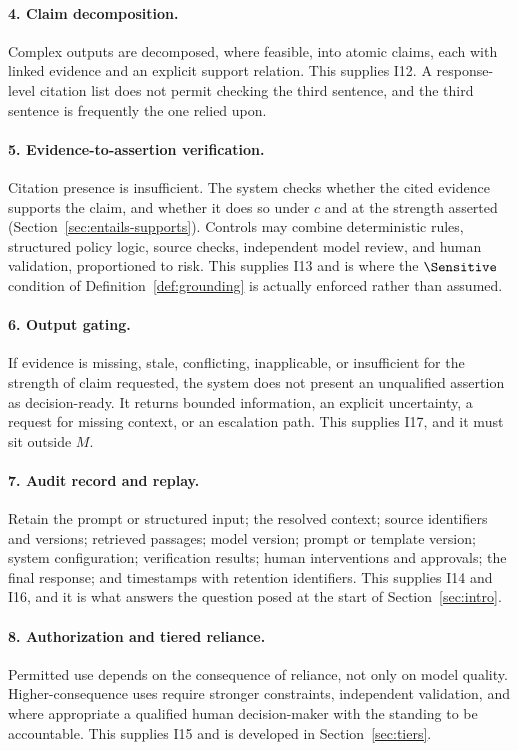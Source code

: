 \paragraph{4. Claim decomposition.} Complex outputs are decomposed, where feasible,
into atomic claims, each with linked evidence and an explicit support relation. This
supplies I12. A response-level citation list does not permit checking the third
sentence, and the third sentence is frequently the one relied upon.

\paragraph{5. Evidence-to-assertion verification.} Citation presence is
insufficient. The system checks whether the cited evidence supports the claim, and
whether it does so under $c$ and at the strength asserted
(Section~\ref{sec:entails-supports}). Controls may combine deterministic rules,
structured policy logic, source checks, independent model review, and human
validation, proportioned to risk. This supplies I13 and is where the
$\Sensitive$ condition of Definition~\ref{def:grounding} is actually enforced
rather than assumed.

\paragraph{6. Output gating.} If evidence is missing, stale, conflicting,
inapplicable, or insufficient for the strength of claim requested, the system does
not present an unqualified assertion as decision-ready. It returns bounded
information, an explicit uncertainty, a request for missing context, or an
escalation path. This supplies I17, and it must sit outside $M$.

\paragraph{7. Audit record and replay.} Retain the prompt or structured input; the
resolved context; source identifiers and versions; retrieved passages; model
version; prompt or template version; system configuration; verification results;
human interventions and approvals; the final response; and timestamps with
retention identifiers. This supplies I14 and I16, and it is what answers the
question posed at the start of Section~\ref{sec:intro}.

\paragraph{8. Authorization and tiered reliance.} Permitted use depends on the
consequence of reliance, not only on model quality. Higher-consequence uses require
stronger constraints, independent validation, and where appropriate a qualified
human decision-maker with the standing to be accountable. This supplies I15 and is
developed in Section~\ref{sec:tiers}.

